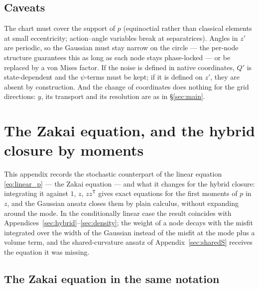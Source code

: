 \documentclass[11pt,a4paper]{article}
\newcommand{\T}{^{\mathsf T}}
\theoremstyle{plain}
\theoremstyle{definition}
\theoremstyle{remark}
\begin{document}
\subsection{Caveats}

The chart must cover the support of $p$ (equinoctial rather than classical elements at small eccentricity; action--angle variables break at separatrices). Angles in $z'$ are periodic, so the Gaussian must stay narrow on the circle --- the per-node structure guarantees this as long as each node stays phase-locked --- or be replaced by a von Mises factor. If the noise is defined in native coordinates, $Q'$ is state-dependent and the $\psi$-terms must be kept; if it is defined on $z'$, they are absent by construction. And the change of coordinates does nothing for the grid directions: $y$, its transport and its resolution are as in \S\ref{sec:main}.

\section{The Zakai equation, and the hybrid closure by moments}
\label{sec:zakai}

This appendix records the stochastic counterpart of the linear equation \eqref{eq:linear_p} --- the Zakai equation --- and what it changes for the hybrid closure: integrating it against $1$, $z$, $zz\T$ gives exact equations for the first moments of $p$ in $z$, and the Gaussian ansatz closes them by plain calculus, without expanding around the mode. In the conditionally linear case the result coincides with Appendices~\ref{sec:hybrid}--\ref{sec:density}; the weight of a node decays with the misfit integrated over the width of the Gaussian instead of the misfit at the mode plus a volume term, and the shared-curvature ansatz of Appendix~\ref{sec:sharedS} receives the equation it was missing.

\subsection{The Zakai equation in the same notation}
\end{document}

